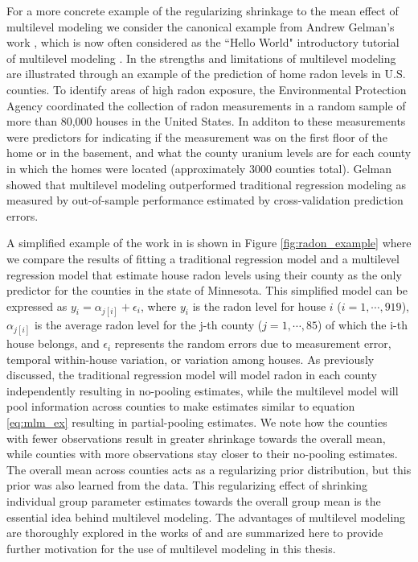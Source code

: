 For a more concrete example of the regularizing shrinkage to the mean effect of multilevel modeling we consider the canonical example from Andrew Gelman's work \cite{Gelman2006} \cite{Gelman2006b}, which is now often considered as the ``Hello World" introductory tutorial of multilevel modeling \cite{pymc32018}. In \cite{Gelman2006b} the strengths and limitations of multilevel modeling are illustrated through an example of the prediction of home radon levels in U.S. counties. To identify areas of high radon exposure, the Environmental Protection Agency coordinated the collection of radon measurements in a random sample of more than 80,000 houses in the United States. In additon to these measurements were predictors for indicating if the measurement was on the first floor of the home or in the basement, and what the county uranium levels are for each county in which the homes were located (approximately 3000 counties total). Gelman showed that multilevel modeling outperformed traditional regression modeling as measured by out-of-sample performance estimated by cross-validation prediction errors.

A simplified example of the work in \cite{Gelman2006b} is shown in Figure \ref{fig:radon_example} where we compare the results of fitting a traditional regression model and a multilevel regression model that estimate house radon levels using their county as the only predictor for the counties in the state of Minnesota. This simplified model can be expressed as $y_i = \alpha_{j[i]} + \epsilon_i$, where $y_i$ is the radon level for house $i$ ($i=1, \cdots ,919$), $\alpha_{j[i]}$ is the average radon level for the j-th county ($j=1, \cdots ,85$) of which the i-th house belongs, and $\epsilon_i$ represents the random errors due to measurement error, temporal within-house variation, or variation among houses. As previously discussed, the traditional regression model will model radon in each county independently resulting in no-pooling estimates, while the multilevel model will pool information across counties to make estimates similar to equation \ref{eq:mlm_ex} resulting in partial-pooling estimates. We note how the counties with fewer observations result in greater shrinkage towards the overall mean, while counties with more observations stay closer to their no-pooling estimates. The overall mean across counties acts as a regularizing prior distribution, but this prior was also learned from the data. This regularizing effect of shrinking individual group parameter estimates towards the overall group mean is the essential idea behind multilevel modeling. The advantages of multilevel modeling are thoroughly explored in the works of \cite{Gelman2014} \cite{Gelman2006} \cite{McElreath2020} and are summarized here to provide further motivation for the use of multilevel modeling in this thesis.

